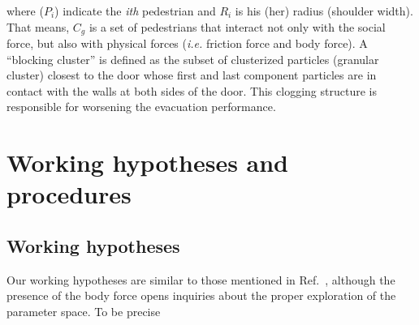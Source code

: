 \documentclass[preprint,12pt]{elsarticle}
\begin{document}
where ($P_i$) indicate the \textit{ith} pedestrian and $R_i$ is his (her) radius (shoulder width). That means, $C_g$ is a
set of pedestrians that interact not only with the social force, but also with physical forces (\textit{i.e.} friction force and body force).
A ``blocking cluster'' is defined as the subset of clusterized particles (granular cluster) closest to the door whose first 
and last component particles are in contact with the walls at both sides of the door. This clogging structure is responsible for 
worsening the evacuation performance. 


\section{\label{hypotheses}Working hypotheses and procedures}


\subsection{Working hypotheses}

Our working hypotheses are similar to those mentioned in 
Ref.~\cite{dorso_2019}, 
although the presence of the body force opens inquiries about the proper 
exploration of the parameter space. To be precise
\end{document}
